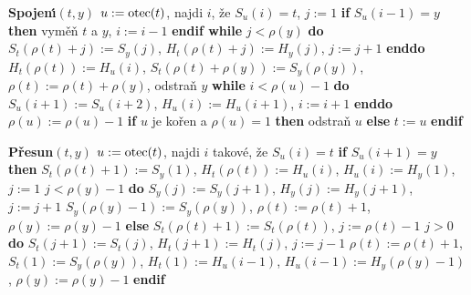 {\bf Spojen\'\i$(t,y)$\newline 
$u:=\operatorname{otec}(t)$}, najdi $i$, \v ze $S_u(i)=t$, $j:=1$\newline 
{\bf if} $S_u(i-1)=y$ {\bf then} vym\v e\v n $t$ a $y$, $i:=i-1$ {\bf endif\newline 
while} $j<\rho (y)$ {\bf do}\newline 
\phantom{---}$S_t(\rho (t)+j):=S_y(j)$, $H_t(\rho (t)+j):=H_y(j)$, $j:=j+1$\newline 
{\bf enddo}\newline 
$H_t(\rho (t)):=H_u(i)$, $S_t(\rho (t)+\rho (y)):=S_y(\rho (y))$, $
\rho (t):=\rho (t)+\rho (y)$, odstra\v n $y$\newline 
{\bf while} $i<\rho (u)-1$ {\bf do}\newline 
\phantom{---}$S_u(i+1):=S_u(i+2)$, $H_u(i):=H_u(i+1)$, $i:=i+1$\newline 
{\bf enddo}\newline 
$\rho (u):=\rho (u)-1$\newline 
{\bf if} $u$ je ko\v ren a $\rho (u)=1$ {\bf then}\newline 
\phantom{---}odstra\v n $u$\newline 
{\bf else}\newline 
\phantom{---}$t:=u$\newline 
{\bf endif}
\medskip

{\bf P\v resun$(t,y)$\newline 
$u:=\operatorname{otec}(t)$}, najdi $i$ takov\'e, \v ze $S_u(i)=t$\newline 
{\bf if} $S_u(i+1)=y$ {\bf then}\newline 
\phantom{---}$S_t(\rho (t)+1):=S_y(1)$, $H_t(\rho (t)):=H_u(i)$,\newline 
\phantom{---}$H_u(i):=H_y(1)$, $j:=1$\newline 
\phantom{---}{\bf while} $j<\rho (y)-1$ {\bf do}\newline 
\phantom{------}$S_y(j):=S_y(j+1)$, $H_y(j):=H_y(j+1)$, $j:=j+1$\newline 
\phantom{---}{\bf enddo}\newline 
\phantom{---}$S_y(\rho (y)-1):=S_y(\rho (y))$, $\rho (t):=\rho (t)+1$, $\rho 
(y):=\rho (y)-1$\newline 
{\bf else}\newline
\phantom{---}$S_t(\rho (t)+1):=S_t(\rho (t))$, $j:=\rho (t)-1$\newline 
\phantom{---}{\bf while} $j>0$ {\bf do}\newline 
\phantom{------}$S_t(j+1):=S_t(j)$, $H_t(j+1):=H_t(j)$, $j:=j-1$\newline 
\phantom{---}{\bf enddo}\newline 
\phantom{---}$\rho (t):=\rho (t)+1$, $S_t(1):=S_y(\rho (y))$, $H_t(1):=H_u(i-
1)$,\newline 
\phantom{---}$H_u(i-1):=H_y(\rho (y)-1)$, $\rho (y):=\rho (y)-1$\newline 
{\bf endif}
\medskip

